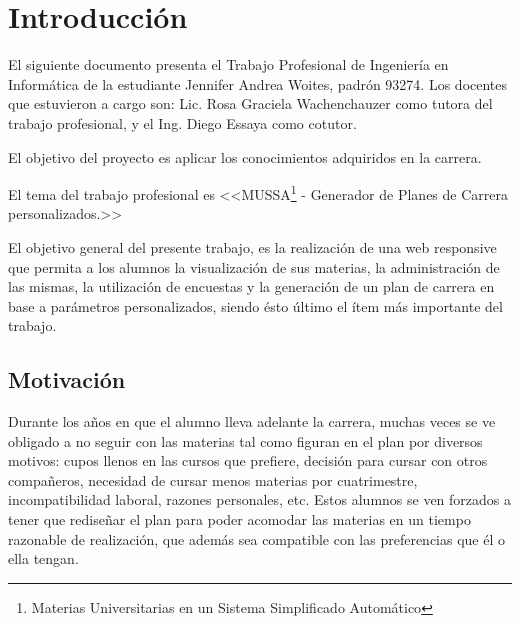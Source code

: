 \documentclass[a4paper]{article}
\begin{document}
  \newpage
  

  \tableofcontents %
    
  \pagestyle{fancy}
  \rhead{}
  \renewcommand{\headrulewidth}{0.4pt} %

  \newpage


\section{Introducción}

El siguiente documento presenta el Trabajo Profesional de Ingeniería en Informática de la estudiante Jennifer Andrea Woites, padrón 93274. Los docentes que estuvieron a cargo son: Lic. Rosa Graciela Wachenchauzer como tutora del trabajo profesional, y el Ing. Diego Essaya como cotutor. \newline

El objetivo del proyecto es aplicar los conocimientos adquiridos en la carrera. \newline

El tema del trabajo profesional es <<MUSSA\footnote{Materias Universitarias en un Sistema Simplificado Automático} - Generador de Planes de Carrera personalizados.>> \newline

El objetivo general del presente trabajo, es la realización de una web responsive que permita a los alumnos la visualización de sus materias, la administración de las mismas, la utilización de encuestas y la generación de un plan de carrera en base a parámetros personalizados, siendo ésto último el ítem más importante del trabajo.

\subsection{Motivación}

Durante los años en que el alumno lleva adelante la carrera, muchas veces se ve obligado a no seguir con las materias tal como figuran en el plan por diversos motivos: cupos llenos en las cursos que prefiere, decisión para cursar con otros compañeros, necesidad de cursar menos materias por cuatrimestre, incompatibilidad laboral, razones personales, etc. Estos alumnos se ven forzados a tener que rediseñar el plan para poder acomodar las materias en un tiempo razonable de realización, que además sea compatible con las preferencias que él o ella tengan.
\end{document}

